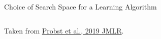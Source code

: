 \begin{frame}{Choice of Search Space for a Learning Algorithm}
\begin{columns}
\begin{column}{0.4\textwidth}
\begin{center}
{        }

        {\tiny Taken from \href{https://www.jmlr.org/papers/volume20/18-444/18-444.pdf}{Probst et al., 2019 JMLR}.}
      \end{center}
    \end{column}
  \end{columns}
\end{frame}

